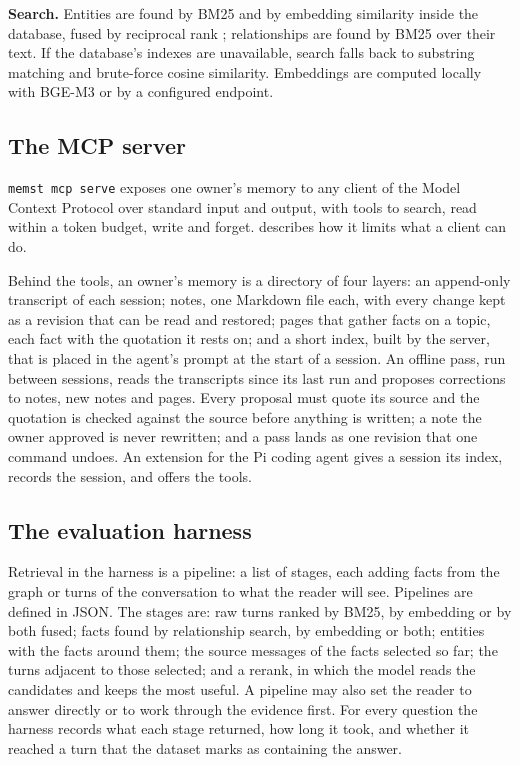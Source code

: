 \documentclass[11pt,letterpaper]{article}
\begin{document}
\textbf{Search.} Entities are found by BM25 and by embedding similarity inside the database, fused by reciprocal rank \citep{cormack2009rrf}; relationships are found by BM25 over their text. If the database's indexes are unavailable, search falls back to substring matching and brute-force cosine similarity. Embeddings are computed locally with BGE-M3 \citep{chen2024bge} or by a configured endpoint.

\subsection{The MCP server}

\texttt{memst mcp serve} exposes one owner's memory to any client of the Model Context Protocol \citep{mcpspec} over standard input and output, with tools to search, read within a token budget, write and forget.  describes how it limits what a client can do.

Behind the tools, an owner's memory is a directory of four layers: an append-only transcript of each session; notes, one Markdown file each, with every change kept as a revision that can be read and restored; pages that gather facts on a topic, each fact with the quotation it rests on; and a short index, built by the server, that is placed in the agent's prompt at the start of a session. An offline pass, run between sessions, reads the transcripts since its last run and proposes corrections to notes, new notes and pages. Every proposal must quote its source and the quotation is checked against the source before anything is written; a note the owner approved is never rewritten; and a pass lands as one revision that one command undoes. An extension for the Pi coding agent gives a session its index, records the session, and offers the tools.

\subsection{The evaluation harness}

Retrieval in the harness is a pipeline: a list of stages, each adding facts from the graph or turns of the conversation to what the reader will see. Pipelines are defined in JSON. The stages are: raw turns ranked by BM25, by embedding or by both fused; facts found by relationship search, by embedding or both; entities with the facts around them; the source messages of the facts selected so far; the turns adjacent to those selected; and a rerank, in which the model reads the candidates and keeps the most useful. A pipeline may also set the reader to answer directly or to work through the evidence first. For every question the harness records what each stage returned, how long it took, and whether it reached a turn that the dataset marks as containing the answer.
\end{document}
